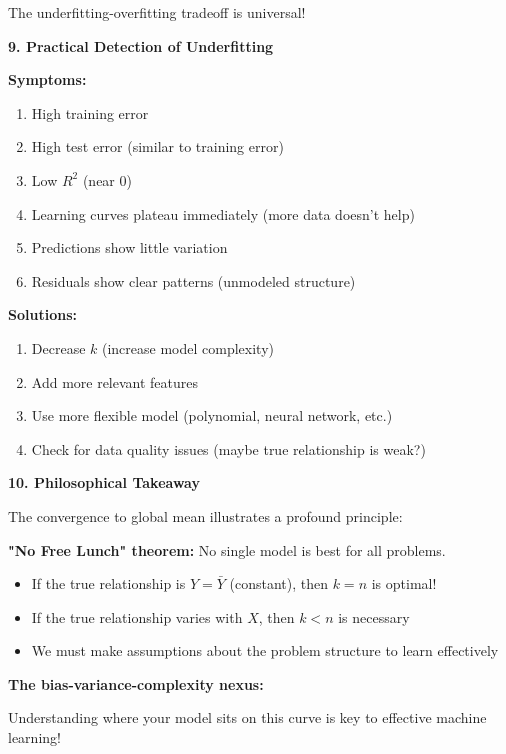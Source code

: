\documentclass[12pt]{article}
\begin{document}
\begin{explanation}
The underfitting-overfitting tradeoff is universal!

\textbf{9. Practical Detection of Underfitting}

\textbf{Symptoms:}
\begin{enumerate}
    \item High training error
    \item High test error (similar to training error)
    \item Low \(R^2\) (near 0)
    \item Learning curves plateau immediately (more data doesn't help)
    \item Predictions show little variation
    \item Residuals show clear patterns (unmodeled structure)
\end{enumerate}

\textbf{Solutions:}
\begin{enumerate}
    \item Decrease \(k\) (increase model complexity)
    \item Add more relevant features
    \item Use more flexible model (polynomial, neural network, etc.)
    \item Check for data quality issues (maybe true relationship is weak?)
\end{enumerate}

\textbf{10. Philosophical Takeaway}

The convergence to global mean illustrates a profound principle:

\textbf{"No Free Lunch" theorem:} No single model is best for all problems.

\begin{itemize}
    \item If the true relationship is \(Y = \bar{Y}\) (constant), then \(k=n\) is optimal!
    \item If the true relationship varies with \(X\), then \(k < n\) is necessary
    \item We must make assumptions about the problem structure to learn effectively
\end{itemize}

\textbf{The bias-variance-complexity nexus:}

\begin{center}
\end{center}

Understanding where your model sits on this curve is key to effective machine learning!
\end{explanation}
\end{document}
